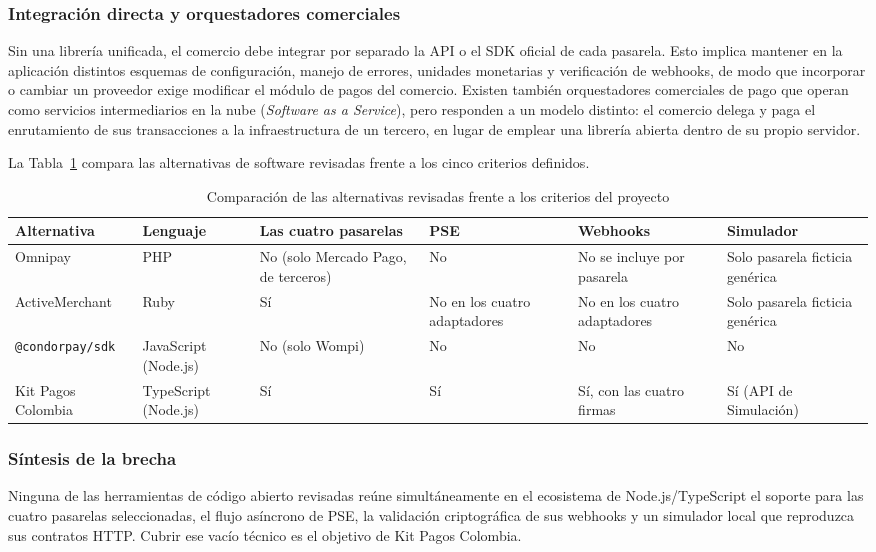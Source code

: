\subsubsection{Integración directa y orquestadores comerciales}
Sin una librería unificada, el comercio debe integrar por separado la API o el SDK oficial de cada pasarela. Esto implica mantener en la aplicación distintos esquemas de configuración, manejo de errores, unidades monetarias y verificación de webhooks, de modo que incorporar o cambiar un proveedor exige modificar el módulo de pagos del comercio. Existen también orquestadores comerciales de pago que operan como servicios intermediarios en la nube (\textit{Software as a Service}), pero responden a un modelo distinto: el comercio delega y paga el enrutamiento de sus transacciones a la infraestructura de un tercero, en lugar de emplear una librería abierta dentro de su propio servidor.

La Tabla~\ref{tab:estado-arte} compara las alternativas de software revisadas frente a los cinco criterios definidos.

\begin{table}[H]
\renewcommand{\arraystretch}{1.2}
\centering
\begin{tabular}{|p{2.6cm}|p{1.8cm}|p{2.3cm}|p{2.1cm}|p{2.2cm}|p{1.8cm}|}
\hline
\textbf{Alternativa} & \textbf{Lenguaje} & \textbf{Las cuatro pasarelas} & \textbf{PSE} & \textbf{Webhooks} & \textbf{Simulador} \\ \hline
Omnipay & PHP & No (solo Mercado Pago, de terceros) & No & No se incluye por pasarela & Solo pasarela ficticia genérica \\ \hline
ActiveMerchant & Ruby & Sí & No en los cuatro adaptadores & No en los cuatro adaptadores & Solo pasarela ficticia genérica \\ \hline
\texttt{@condorpay/sdk} & JavaScript (Node.js) & No (solo Wompi) & No & No & No \\ \hline
Kit Pagos Colombia & TypeScript (Node.js) & Sí & Sí & Sí, con las cuatro firmas & Sí (API de Simulación) \\ \hline
\end{tabular}
\caption{Comparación de las alternativas revisadas frente a los criterios del proyecto}
\label{tab:estado-arte}
\end{table}

\subsubsection{Síntesis de la brecha}
Ninguna de las herramientas de código abierto revisadas reúne simultáneamente en el ecosistema de Node.js/TypeScript el soporte para las cuatro pasarelas seleccionadas, el flujo asíncrono de PSE, la validación criptográfica de sus webhooks y un simulador local que reproduzca sus contratos HTTP. Cubrir ese vacío técnico es el objetivo de Kit Pagos Colombia.
